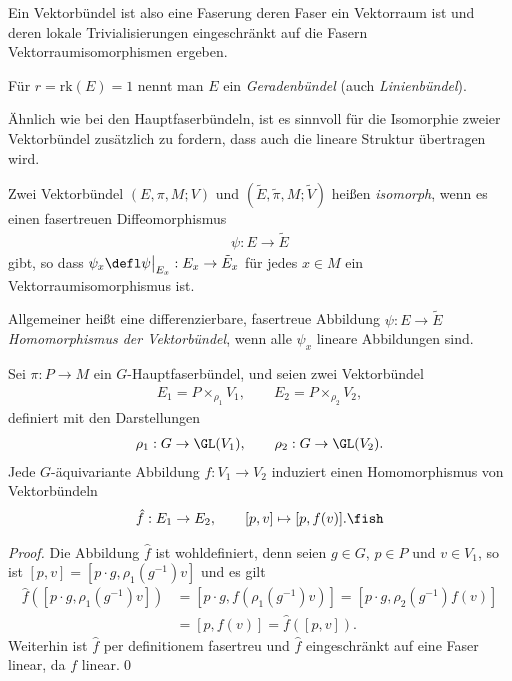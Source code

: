 \documentclass[%
	paper=a5,%
	fleqn,%
	DIV=18,%
	BCOR=0mm,
	fontsize=11pt,
	titlepage=false,%
	bibliography=totoc,
	DIV=18,%
	twoside=true,
	pdftitle=Riemannsche Geometrie,
	pdfauthor=Uwe Semmelmann,
	numbers=noendperiod]%
	{scrbook}
\begin{document}
Ein Vektorbündel ist also eine Faserung deren Faser ein Vektorraum ist und
deren lokale Trivialisierungen eingeschränkt auf die Fasern
Vektorraumisomorphismen ergeben.

\begin{rem}[Bezeichnung.]
Für $r = \mathrm{rk}(E) = 1$ nennt man $E$ ein \emph{Geradenbündel} (auch
\emph{Linienbündel}).\map
\end{rem}


Ähnlich wie bei den Hauptfaserbündeln, ist es sinnvoll für die Isomorphie zweier
Vektorbündel zusätzlich zu fordern, dass auch die lineare Struktur übertragen
wird.

\begin{defn}
Zwei Vektorbündel $(E,\pi,M;V)$ und $(\tilde{E},\tilde{\pi},M;\tilde V)$ heißen
\emph{isomorph}, wenn es einen fasertreuen Diffeomorphismus
\begin{align*}
\psi: E\to \tilde{E}
\end{align*}
gibt, so dass $\psi_x \defl \psi\big|_{E_x} : E_x\to \tilde{E}_x$ für jedes
$x\in M$ ein Vektorraumisomorphismus ist.

Allgemeiner heißt eine differenzierbare, fasertreue Abbildung $\psi: E\to \tilde{E}$
\emph{Homomorphismus der Vektorbündel}, wenn alle $\psi_x$
lineare Abbildungen sind.\fish
\end{defn}


\begin{lem}
Sei $\pi: P\to M$ ein $G$-Hauptfaserbündel, und seien zwei Vektorbündel
\begin{align*}
E_1 = P\times_{\rho_1} V_1,\qquad E_2 = P\times_{\rho_2} V_2, 
\end{align*}
definiert mit den Darstellungen
\begin{align*}
\rho_1 : G\to \GL(V_1),\qquad \rho_2 : G\to \GL(V_2).
\end{align*}
Jede $G$-äquivariante Abbildung $f: V_1\to V_2$ induziert
einen Homomorphismus von Vektorbündeln
\begin{align*}
\hat{f}: E_1\to E_2,\qquad [p,v] \mapsto [p,f(v)].\fish
\end{align*}
\end{lem}
\begin{proof}
Die Abbildung $\hat{f}$ ist wohldefiniert, denn seien $g\in G$, $p\in P$ und
$v\in V_1$, so ist $[p,v] = [p\cdot g,\rho_1(g^{-1})v]$ und es gilt
\begin{align*}
\hat{f}([p\cdot g,\rho_1(g^{-1})v]) &= 
[p\cdot g,f(\rho_1(g^{-1})v)] = [p\cdot g,\rho_2(g^{-1})f(v)] \\
&= [p,f(v)] = \hat{f}([p,v]).
\end{align*}
Weiterhin ist $\hat{f}$ per definitionem fasertreu und
$\hat{f}$ eingeschränkt auf eine Faser linear, da $f$ linear.\qed
\end{proof}
\end{document}
